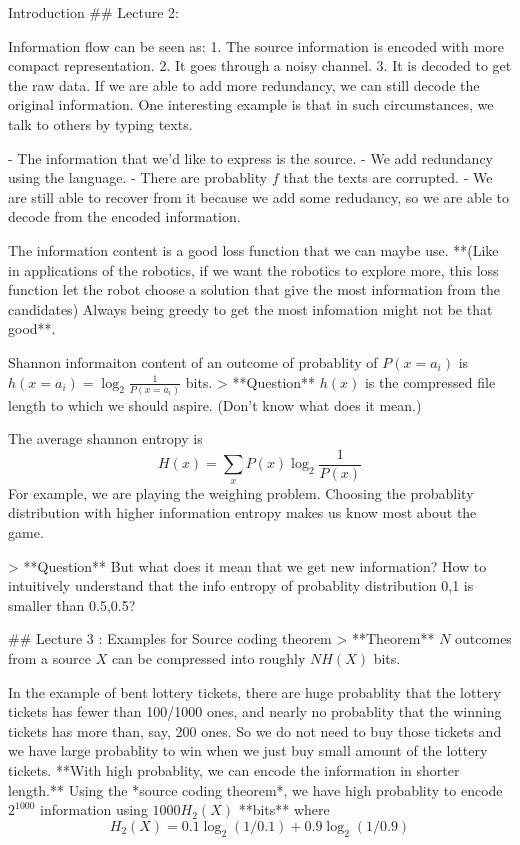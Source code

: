 \documentclass{beamer}
\begin{document}
\begin{frame}[allowframebreaks]{Introduction}
    ## Lecture 2: 
    
    Information flow can be seen as:
    1. The source information is encoded with more compact representation.
    2. It goes through a noisy channel.
    3. It is decoded to get the raw data.
    If we are able to add more redundancy, we can still decode the original information.
    One interesting example is that in such circumstances, we talk to others by typing texts. 
    
    - The information that we'd like to express is the source.
    - We add redundancy using the language.
    - There are probablity $f$ that the texts are corrupted. 
    - We are still able to recover from it because we add some redudancy, so we are able to decode from the encoded information.
    
    The information content is a good loss function that we can maybe use. **(Like in applications of the robotics, if we want the robotics to explore more, this loss function let the robot choose a solution that give the most information from the candidates) Always being greedy to get the most infomation might not be that good**.
    
    Shannon informaiton content of an outcome of probablity of $P(x=a_i)$ is $h(x=a_i)=\log_2 \frac{1}{P(x=a_i)}$ bits.
    > **Question** 
    $h(x)$ is the compressed file length to which we should aspire. (Don't know what does it mean.)
    
    The average shannon entropy is $$H(x) = \sum_x P(x) \log_2 \frac{1}{P(x)}$$ For example, we are playing the weighing problem. Choosing the probablity distribution with higher information entropy makes us know most about the game.
    
    > **Question**
    But what does it mean that we get new information? How to intuitively understand that the info entropy of probablity distribution {0,1} is smaller than {0.5,0.5}?
    
    ## Lecture 3 : Examples for Source coding theorem
    > **Theorem**
    $N$ outcomes from a source $X$ can be compressed into roughly $NH(X)$ bits.
    
    In the example of bent lottery tickets, there are huge probablity that the lottery tickets has fewer than 100/1000 ones, and nearly no probablity that the winning tickets has more than, say, 200 ones. So we do not need to buy those tickets and we have large probablity to win when we just buy small amount of the lottery tickets. **With high probablity, we can encode the information in shorter length.** Using the *source coding theorem*, we have high probablity to encode $2^{1000}$ information using $1000H_2(X)$ **bits** 
    where $$H_2(X)=0.1\log_2(1/0.1)+0.9\log_2(1/0.9)$$
    

\end{frame}
\end{document}
